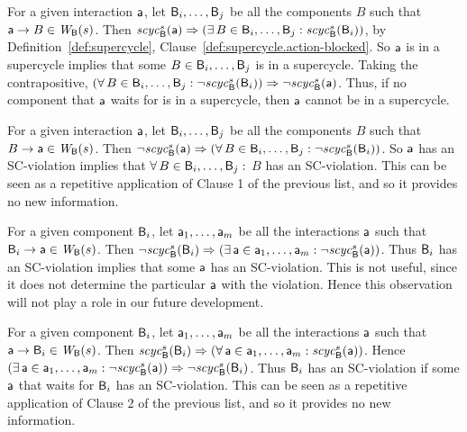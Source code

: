 \item For a given interaction $\mathsf{a}$, let $\mathsf{B}_i,\ldots,\mathsf{B}_j$ be all the components $B$ such that $\mathsf{a} \rightarrow
  B \in \mathit{W}_{\mathsf{B}}({s})$.  Then 
 $\mathit{scyc}_{\mathsf{B}}^{s}({\mathsf{a}}) \Rightarrow (\exists\, B \in \mathsf{B}_i,\ldots,\mathsf{B}_j: \mathit{scyc}_{\mathsf{B}}^{s}({\mathsf{B}_i}))$, by 
  Definition~\ref{def:supercycle}, Clause~\ref{def:supercycle.action-blocked}.
  So $\mathsf{a}$ is in a supercycle implies that some $B \in \mathsf{B}_i,\ldots,\mathsf{B}_j$ is
  in a supercycle.  Taking the contrapositive, $(\forall\, B \in \mathsf{B}_i,\ldots,\mathsf{B}_j: \neg \mathit{scyc}_{\mathsf{B}}^{s}({\mathsf{B}_i}))
  \Rightarrow \neg \mathit{scyc}_{\mathsf{B}}^{s}({\mathsf{a}})$.  Thus, if no component that $\mathsf{a}$ waits for is in a supercycle,
  then $\mathsf{a}$ cannot be in a supercycle.

\item For a given interaction $\mathsf{a}$, let $\mathsf{B}_i,\ldots,\mathsf{B}_j$ be all the components $B$ such that $B \rightarrow \mathsf{a} \in \mathit{W}_{\mathsf{B}}({s})$.
Then $\neg \mathit{scyc}_{\mathsf{B}}^{s}({\mathsf{a}}) \Rightarrow (\forall\, B \in \mathsf{B}_i,\ldots,\mathsf{B}_j: \neg \mathit{scyc}_{\mathsf{B}}^{s}({\mathsf{B}_i}))$.
So $\mathsf{a}$ has an SC-violation implies that $\forall\, B \in \mathsf{B}_i,\ldots,\mathsf{B}_j:$ $B$ has an SC-violation.
This can be seen as a repetitive application of Clause 1 of the previous list, and so it provides no new information.

\item For a given component $\mathsf{B}_i$, let $\mathsf{a}_1,\ldots, \mathsf{a}_m$ be all the interactions $\mathsf{a}$ such that $\mathsf{B}_i \rightarrow \mathsf{a} \in \mathit{W}_{\mathsf{B}}({s})$.
Then $\neg \mathit{scyc}_{\mathsf{B}}^{s}({\mathsf{B}_i}) \Rightarrow (\exists\, \mathsf{a} \in \mathsf{a}_1,\ldots,\mathsf{a}_m: \neg \mathit{scyc}_{\mathsf{B}}^{s}({\mathsf{a}}))$.
Thus $\mathsf{B}_i$ has an SC-violation implies that some $\mathsf{a}$ has an SC-violation. This is not useful, since it does not
determine the particular $\mathsf{a}$ with the violation. Hence this observation will not play a role in our future development.

\item For a given component $\mathsf{B}_i$, let $\mathsf{a}_1,\ldots, \mathsf{a}_m$ be all the interactions $\mathsf{a}$ such that $\mathsf{a} \rightarrow \mathsf{B}_i \in \mathit{W}_{\mathsf{B}}({s})$.
Then $\mathit{scyc}_{\mathsf{B}}^{s}({\mathsf{B}_i}) \Rightarrow (\forall\, \mathsf{a} \in \mathsf{a}_1,\ldots,\mathsf{a}_m: \mathit{scyc}_{\mathsf{B}}^{s}({\mathsf{a}}))$.
Hence $(\exists\, \mathsf{a} \in \mathsf{a}_1,\ldots,\mathsf{a}_m: \neg \mathit{scyc}_{\mathsf{B}}^{s}({\mathsf{a}})) \Rightarrow \neg \mathit{scyc}_{\mathsf{B}}^{s}({\mathsf{B}_i})$.
Thus $\mathsf{B}_i$ has an SC-violation if some $\mathsf{a}$ that waits for $\mathsf{B}_i$ has an SC-violation.
This can be seen as a repetitive application of Clause 2 of the previous list, and so it provides no new information.

